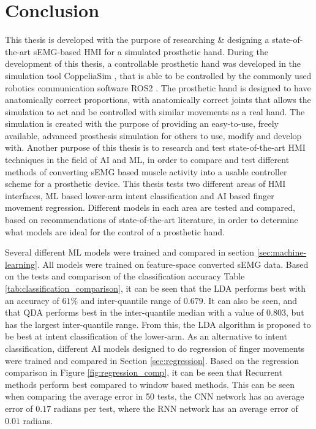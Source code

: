 \documentclass[../main.tex]{subfiles}
\begin{document}
\section{Conclusion}

This thesis is developed with the purpose of researching \& designing a state-of-the-art \gls{sEMG}-based \gls{HMI} for a simulated prosthetic hand.
During the development of this thesis, a controllable prosthetic hand was developed in the simulation tool CoppeliaSim \cite{coppeliasim}, that is able to be controlled by the commonly used robotics communication software ROS2 \cite{ros2}.
The prosthetic hand is designed to have anatomically correct proportions, with anatomically correct joints that allows the simulation to act and be controlled with similar movements as a real hand. 
The simulation is created with the purpose of providing an easy-to-use, freely available, advanced prosthesis simulation for others to use, modify and develop with. 
Another purpose of this thesis is to research and test state-of-the-art \gls{HMI} techniques in the field of \gls{AI} and \gls{ML}, in order to compare and test different methods of converting \gls{sEMG} based muscle activity into a usable controller scheme for a prosthetic device.
This thesis tests two different areas of \gls{HMI} interfaces, \gls{ML} based lower-arm intent classification and \gls{AI} based finger movement regression.
Different models in each area are tested and compared, based on recommendations of state-of-the-art
literature, in order to determine what models are ideal for the control of a prosthetic hand.

Several different \gls{ML} models were trained and compared in section \ref{sec:machine-learning}.
All models were trained on feature-space converted \gls{sEMG} data.
Based on the tests and comparison of the classification accuracy Table \ref{tab:classification_comparison}, it can be seen that the \gls{LDA} performs best with an accuracy of $61\%$ and inter-quantile range of $0.679$.
It can also be seen, and that \gls{QDA} performs best in the inter-quantile median with a value of $0.803$, but has the largest inter-quantile range.
From this, the \gls{LDA} algorithm is proposed to be best at intent classification of the lower-arm.
As an alternative to intent classification, different \gls{AI} models designed to do regression of finger movements were trained and compared in Section \ref{sec:regression}.
Based on the regression comparison in Figure \ref{fig:regression_comp}, it can be seen that Recurrent methods perform best compared to window based methods.
This can be seen when comparing the average error in 50 tests, the \gls{CNN} network has an average error of $0.17$ radians per test, where the \gls{RNN} network has an average error of $0.01$ radians.
\end{document}
